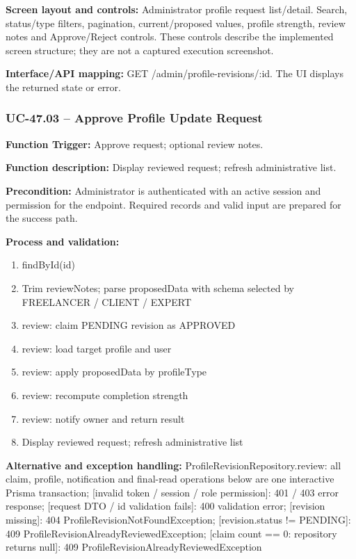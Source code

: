 \textbf{Screen layout and controls:} Administrator profile request list/\allowbreak{}detail. Search, status/\allowbreak{}type filters, pagination, current/\allowbreak{}proposed values, profile strength, review notes and Approve/\allowbreak{}Reject controls. These controls describe the implemented screen structure; they are not a captured execution screenshot.

\textbf{Interface/\allowbreak{}API mapping:} GET /\allowbreak{}admin/\allowbreak{}profile-revisions/\allowbreak{}:id. The UI displays the returned state or error.

\subsubsection{UC-47.03 -- Approve Profile Update Request}
\textbf{Function Trigger:} Approve request; optional review notes.

\textbf{Function description:} Display reviewed request; refresh administrative list.

\textbf{Precondition:} Administrator is authenticated with an active session and permission for the endpoint. Required records and valid input are prepared for the success path.

\textbf{Process and validation:}
\begin{enumerate}
\item find\allowbreak{}By\allowbreak{}Id(id)
\item Trim review\allowbreak{}Notes; parse proposed\allowbreak{}Data with schema selected by FREELANCER /\allowbreak{} CLIENT /\allowbreak{} EXPERT
\item review: claim PENDING revision as APPROVED
\item review: load target profile and user
\item review: apply proposed\allowbreak{}Data by profile\allowbreak{}Type
\item review: recompute completion strength
\item review: notify owner and return result
\item Display reviewed request; refresh administrative list
\end{enumerate}
\textbf{Alternative and exception handling:} Profile\allowbreak{}Revision\allowbreak{}Repository.review: all claim, profile, notification and final-read operations below are one interactive Prisma transaction; [invalid token /\allowbreak{} session /\allowbreak{} role permission]: 401 /\allowbreak{} 403 error response; [request DTO /\allowbreak{} id validation fails]: 400 validation error; [revision missing]: 404 Profile\allowbreak{}Revision\allowbreak{}Not\allowbreak{}Found\allowbreak{}Exception; [revision.status !=\allowbreak{} PENDING]: 409 Profile\allowbreak{}Revision\allowbreak{}Already\allowbreak{}Reviewed\allowbreak{}Exception; [claim count =\allowbreak{}=\allowbreak{} 0: repository returns null]: 409 Profile\allowbreak{}Revision\allowbreak{}Already\allowbreak{}Reviewed\allowbreak{}Exception

